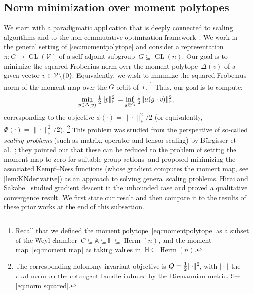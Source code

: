 \documentclass[11pt,letterpaper]{article}
\numberwithin{equation}{section}
\renewcommand{\AA}{\mathbb{A}}
\newcommand{\bbH}{\mathbb{H}}
\newcommand{\VV}{\mathcal{V}}
\DeclareMathOperator{\GL}{GL}
\DeclareMathOperator{\Herm}{Herm}
\DeclarePairedDelimiter\norm{\lVert}{\rVert}
\begin{document}
\subsection{Norm minimization over moment polytopes}\label{sub:norm minimization}
We start with a paradigmatic application that is deeply connected to scaling algorithms and to the non-commutative optimization framework~\cite{BFGOWW2019}.
We work in the general setting of \cref{sec:momentpolytope} and consider a representation $\pi \colon G \to \GL(\VV)$ of a self-adjoint subgroup~$G \subseteq \GL(n)$.
Our goal is to minimize the squared Frobenius norm over the moment polytope~$\Delta(v)$ of a given vector $v \in \VV\setminus\{0\}$.
Equivalently, we wish to minimize the squared Frobenius norm of the moment map over the $G$-orbit of~$v$.%
\footnote{Recall that we defined the moment polytope~\eqref{eq:momentpolytope} as a subset of the Weyl chamber~$C \subseteq \AA \subseteq \bbH \subseteq \Herm(n)$, and the moment map~\eqref{eq:moment map} as taking values in~$\bbH \subseteq \Herm(n)$.}
Thus, our goal is to compute:
\begin{align}\label{eq:norm min goal}
    \min_{p \in \Delta(v)} \tfrac12\norm{p}_{\mathrm{F}}^2 = \inf_{g \in G} \tfrac12\norm{\mu(g\cdot v)}_{\mathrm{F}}^2,
\end{align}
corresponding to the objective $\phi(\cdot) = \|\cdot\|_{\mathrm F}^2/2$ (or equivalently, $\Phi(\cdot) = \|\cdot\|_{\mathrm{F}}^2/2$).%
\footnote{The corresponding holonomy-invariant objective is $Q = \frac12\norm{\cdot}^2$, with $\norm{\cdot}$ the dual norm on the cotangent bundle induced by the Riemannian metric. See \cref{eq:norm squared}.}
This problem was studied from the perspective of so-called \emph{scaling problems} (such as matrix, operator and tensor scaling) by B\"{u}rgisser et al.~\cite{BFGOWW2019}; they pointed out that these can be reduced to the problem of setting the moment map to zero for suitable group actions, and proposed minimizing the associated Kempf--Ness functions (whose gradient computes the moment map, see \cref{lem:KNderivative}) as an approach to solving general scaling problems.
Hirai and Sakabe~\cite{HiraiSakabe2024} studied gradient descent in the unbounded case and proved a qualitative convergence result.
We first state our result and then compare it to the results of these prior works at the end of this subsection.
\end{document}
